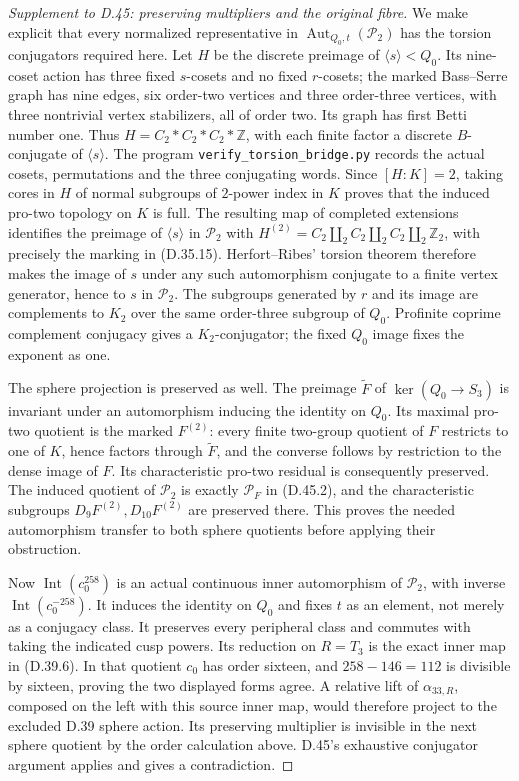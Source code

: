 \begin{proof}[Supplement to D.45: preserving multipliers and the original fibre]
We make explicit that every normalized representative in
\(\operatorname{Aut}_{Q_0,t}(\mathcal P_2)\) has the torsion
conjugators required here. Let \(H\) be the discrete preimage
of \(\langle s\rangle<Q_0\). Its nine-coset action has three
fixed \(s\)-cosets and no fixed \(r\)-cosets; the marked
Bass--Serre graph has nine edges, six order-two vertices and
three order-three vertices, with three nontrivial vertex
stabilizers, all of order two. Its graph has first Betti
number one. Thus \(H=C_2*C_2*C_2*\mathbb Z\), with each
finite factor a discrete \(B\)-conjugate of \(\langle s\rangle\).
The program \texttt{verify\_torsion\_bridge.py} records the actual
cosets, permutations and the three conjugating words.
Since \([H:K]=2\), taking cores in \(H\) of normal
subgroups of \(2\)-power index in \(K\) proves that the
induced pro-two topology on \(K\) is full. The resulting
map of completed extensions identifies the preimage of
\(\langle s\rangle\) in \(\mathcal P_2\) with
\(H^{(2)}=C_2\amalg_2C_2\amalg_2C_2\amalg_2\mathbb Z_2\),
with precisely the marking in (D.35.15).
Herfort--Ribes' torsion theorem
\cite[Theorem A$'$, pp.~157--159]{A_HerfortRibes1985}
therefore makes the image of \(s\) under any such
automorphism conjugate to a finite vertex generator,
hence to \(s\) in \(\mathcal P_2\).
The subgroups generated by \(r\) and its image are
complements to \(K_2\) over the same order-three
subgroup of \(Q_0\). Profinite coprime complement
conjugacy gives a \(K_2\)-conjugator; the fixed
\(Q_0\) image fixes the exponent as one.

The sphere projection is preserved as well. The preimage
\(\widetilde F\) of \(\ker(Q_0\to S_3)\) is invariant
under an automorphism inducing the identity on \(Q_0\).
Its maximal pro-two quotient is the marked \(F^{(2)}\):
every finite two-group quotient of \(F\) restricts to
one of \(K\), hence factors through \(\widetilde F\),
and the converse follows by restriction to the dense
image of \(F\). Its characteristic pro-two residual
is consequently preserved. The induced quotient of
\(\mathcal P_2\) is exactly \(\mathcal P_F\) in
(D.45.2), and the characteristic subgroups
\(D_9F^{(2)},D_{10}F^{(2)}\) are preserved there.
This proves the needed automorphism transfer to both
sphere quotients before applying their obstruction.

Now \(\operatorname{Int}(c_0^{258})\) is an actual
continuous inner automorphism of \(\mathcal P_2\),
with inverse \(\operatorname{Int}(c_0^{-258})\).
It induces the identity on \(Q_0\) and fixes \(t\)
as an element, not merely as a conjugacy class.
It preserves every peripheral class and commutes
with taking the indicated cusp powers. Its
reduction on \(R=T_3\) is the exact inner map
in (D.39.6). In that quotient \(c_0\) has order
sixteen, and \(258-146=112\) is divisible by
sixteen, proving the two displayed forms agree.
A relative lift of \(\alpha_{33,R}\), composed
on the left with this source inner map, would
therefore project to the excluded D.39 sphere
action. Its preserving multiplier is invisible
in the next sphere quotient by the order
calculation above. D.45's exhaustive conjugator
argument applies and gives a contradiction.


\end{proof}

